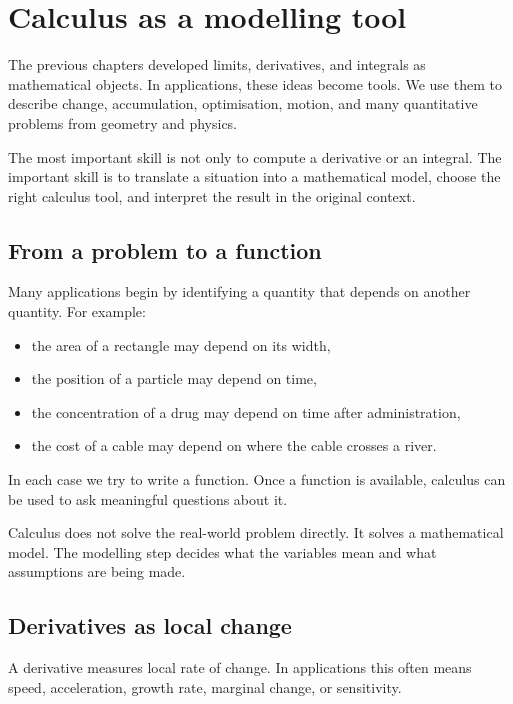 \section{Calculus as a modelling tool}

The previous chapters developed limits, derivatives, and integrals as mathematical objects. In applications, these ideas become tools. We use them to describe change, accumulation, optimisation, motion, and many quantitative problems from geometry and physics.

The most important skill is not only to compute a derivative or an integral. The important skill is to translate a situation into a mathematical model, choose the right calculus tool, and interpret the result in the original context.

\subsection*{From a problem to a function}

Many applications begin by identifying a quantity that depends on another quantity. For example:
\begin{itemize}
\item the area of a rectangle may depend on its width,
\item the position of a particle may depend on time,
\item the concentration of a drug may depend on time after administration,
\item the cost of a cable may depend on where the cable crosses a river.
\end{itemize}

In each case we try to write a function. Once a function is available, calculus can be used to ask meaningful questions about it.

\begin{remarkbox}
Calculus does not solve the real-world problem directly. It solves a mathematical model. The modelling step decides what the variables mean and what assumptions are being made.
\end{remarkbox}

\subsection*{Derivatives as local change}

A derivative measures local rate of change. In applications this often means speed, acceleration, growth rate, marginal change, or sensitivity.

